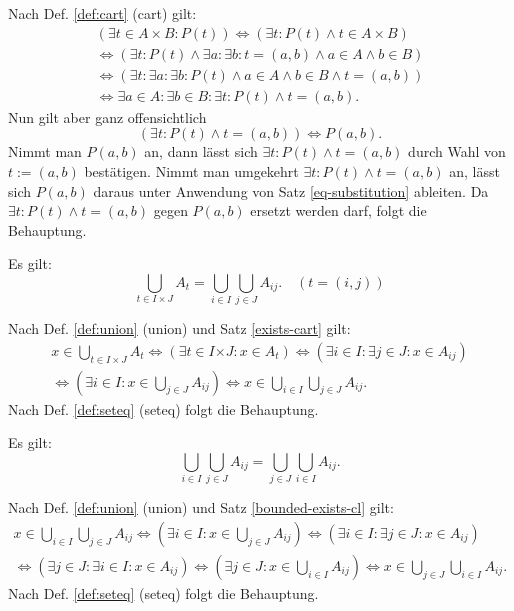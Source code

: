 \begin{Beweis}
Nach Def. \ref{def:cart} (cart) gilt:
\begin{gather*}
(\exists t{\in}A{\times}B\colon P(t))
\iff (\exists t\colon P(t)\land t\in A\times B)\\
\iff (\exists t\colon P(t)\land \exists a\colon\exists b\colon t=(a,b)\land a\in A\land b\in B)\\
\iff (\exists t\colon \exists a\colon \exists b\colon P(t)\land a\in A\land b\in B\land t=(a,b))\\
\iff \exists a{\in}A\colon \exists b{\in}B\colon \exists t\colon P(t)\land t=(a,b).
\end{gather*}
Nun gilt aber ganz offensichtlich
\[(\exists t\colon P(t)\land t=(a,b))\iff P(a,b).\]
Nimmt man $P(a,b)$ an, dann lässt sich $\exists t\colon P(t)\land t=(a,b)$
durch Wahl von $t:=(a,b)$ bestätigen. Nimmt man umgekehrt
$\exists t\colon P(t)\land t=(a,b)$ an, lässt sich $P(a,b)$ daraus
unter Anwendung von Satz \ref{eq-substitution} ableiten.
Da $\exists t\colon P(t)\land t=(a,b)$ gegen $P(a,b)$ ersetzt
werden darf, folgt die Behauptung.\,\qedsymbol
\end{Beweis}

\newpage
\begin{Satz}\label{cup-cart}
Es gilt:
\[\bigcup_{t\in I\times J} A_t
= \bigcup_{i\in I}\bigcup_{j\in J} A_{ij}.\quad (t=(i,j))\]
\end{Satz}

\begin{Beweis}
Nach Def. \ref{def:union} (union) und Satz \ref{exists-cart} gilt:
\begin{gather*}
x\in \bigcup_{t\in I\times J} A_t
\iff (\exists t\in I{\times J}\colon x\in A_t)
\iff (\exists i{\in}I\colon\exists j{\in}J\colon x\in A_{ij})\\
\iff (\exists i{\in}I\colon x\in \bigcup_{j\in J} A_{ij})
\iff x\in\bigcup_{i\in I}\bigcup_{j\in J} A_{ij}.
\end{gather*}
Nach Def. \ref{def:seteq} (seteq) folgt die Behauptung.\,\qedsymbol
\end{Beweis}

\begin{Satz}
Es gilt:
\[\bigcup_{i\in I}\bigcup_{j\in J} A_{ij}
= \bigcup_{j\in J}\bigcup_{i\in I} A_{ij}.\]
\end{Satz}

\begin{Beweis}
Nach Def. \ref{def:union} (union) und Satz \ref{bounded-exists-cl} gilt:
\begin{gather*}
x\in\bigcup_{i\in I}\bigcup_{j\in J} A_{ij}
\iff (\exists i{\in}I\colon x\in\bigcup_{j\in J} A_{ij})
\iff (\exists i{\in}I\colon\exists j{\in}J\colon x\in A_{ij})\\
\iff (\exists j{\in}J\colon\exists i{\in}I\colon x\in A_{ij})
\iff (\exists j{\in}J\colon x\in \bigcup_{i\in I}A_{ij})
\iff x\in\bigcup_{j\in J}\bigcup_{i\in I} A_{ij}.
\end{gather*}
Nach Def. \ref{def:seteq} (seteq) folgt die Behauptung.\,\qedsymbol
\end{Beweis}

